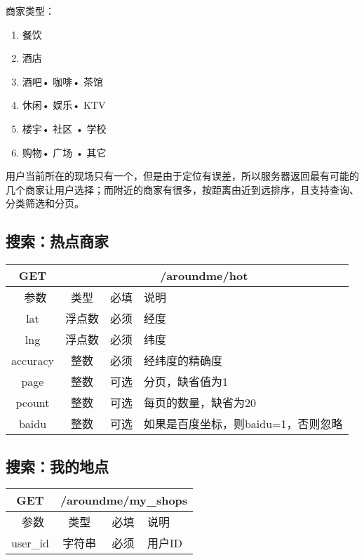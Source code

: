 \documentclass[cs4size]{ctexartutf8}
\begin{document}
商家类型：
\begin{enumerate}
\item 餐饮
\item 酒店
\item 酒吧• 咖啡• 茶馆   
\item 休闲• 娱乐• KTV
\item 楼宇• 社区 • 学校
\item 购物• 广场 • 其它
\end{enumerate}


用户当前所在的现场只有一个，但是由于定位有误差，所以服务器返回最有可能的几个商家让用户选择；而附近的商家有很多，按距离由近到远排序，且支持查询、分类筛选和分页。


\subsection{搜索：热点商家}

\begin{table}[H]
   \begin{center}
\begin{tabular}{|c|c|c|p{12cm}|}
\hline
GET & \multicolumn{3}{|c|}{/aroundme/hot} \\
\hline\hline
 \  参数  & 类型 & 必填 &  说明  \\
\hline
 lat  & 浮点数 & 必须 & 经度\\
\hline
 lng  &  浮点数 & 必须 & 纬度\\ 
\hline
 accuracy  & 整数 & 必须 & 经纬度的精确度\\ 
 \hline
 page  & 整数 & 可选 & 分页，缺省值为1\\ 
 \hline
 pcount  & 整数 & 可选 & 每页的数量，缺省为20\\ 
\hline
 baidu  & 整数 & 可选 & 如果是百度坐标，则baidu=1，否则忽略\\  
\hline
\end{tabular}
   \end{center}
\end{table}



\subsection{搜索：我的地点}

\begin{table}[H]
   \begin{center}
\begin{tabular}{|c|c|c|p{12cm}|}
\hline
GET & \multicolumn{3}{|c|}{/aroundme/my\_shops} \\
\hline\hline
 \  参数  & 类型 & 必填 &  说明  \\
\hline
 user\_id  & 字符串 & 必须 & 用户ID\\
 \hline
\end{tabular}
   \end{center}
\end{table}
\end{document}
